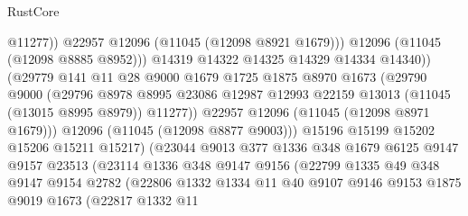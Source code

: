 \begin{lexlean}{RustCore}
\begin{coremodule}
                                  @11277))
                              @22957
                              @12096
                              (@11045 (@12098 @8921 @1679)))
                            @12096
                            (@11045 (@12098 @8885 @8952)))
                          @14319
                          @14322
                          @14325
                          @14329
                          @14334
                          @14340))
                      (@29779
                        @141
                        @11
                        @28
                        @9000
                        @1679
                        @1725
                        @1875
                        @8970
                        @1673
                        (@29790
                          @9000
                          (@29796
                            @8978
                            @8995
                            @23086
                            @12987
                            @12993
                            @22159
                            @13013
                            (@11045 (@13015 @8995 @8979))
                            @11277))
                        @22957
                        @12096
                        (@11045 (@12098 @8971 @1679)))
                      @12096
                      (@11045 (@12098 @8877 @9003)))
                    @15196
                    @15199
                    @15202
                    @15206
                    @15211
                    @15217)
                  (@23044
                    @9013
                    @377
                    @1336
                    @348
                    @1679
                    @6125
                    @9147
                    @9157
                    @23513
                    (@23114
                      @1336
                      @348
                      @9147
                      @9156
                      (@22799
                        @1335
                        @49
                        @348
                        @9147
                        @9154
                        @2782
                        (@22806
                          @1332
                          @1334
                          @11
                          @40
                          @9107
                          @9146
                          @9153
                          @1875
                          @9019
                          @1673
                          (@22817
                            @1332
                            @11

\end{coremodule}
\end{lexlean}
